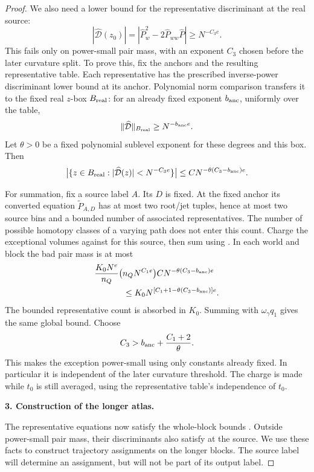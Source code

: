 \begin{proof}
We also need a lower bound for the representative
discriminant at the real source:
\begin{equation}
 |\widehat{\mathcal D}(z_0)|
 =
 |\widehat P_w^2-2\widehat P_{ww}\widehat P|
 \ge N^{-C_3e}.
 \label{a02:representative-disc-lower}
\end{equation}
This fails only on power-small pair mass, with an exponent
\(C_3\) chosen before the later curvature split.  To prove this,
fix the anchors and the resulting representative table.  Each
representative has the prescribed inverse-power discriminant
lower bound at its anchor.  Polynomial norm comparison transfers
it to the fixed real \(z\)-box \(B_{\rm real}\): for an already
fixed exponent \(b_{\rm anc}\), uniformly over the table,
\[
 \|\widehat{\mathcal D}\|_{B_{\rm real}}
 \ge N^{-b_{\rm anc}e}.
\]
Let \(\theta>0\) be a fixed polynomial sublevel exponent for
these degrees and this box.  Then
\[
 \bigl|\{z\in B_{\rm real}:
       |\widehat{\mathcal D}(z)|<N^{-C_3e}\}\bigr|
 \le C N^{-\theta(C_3-b_{\rm anc})e}.
\]

For summation, fix a source label \(A\).  Its \(D\)
is fixed.  At the fixed anchor its converted equation
\(\widetilde P_{A,D}\) has at most two root/jet tuples,
hence at most two source
bins and a bounded number of associated representatives.
The number of possible homotopy classes of a varying
path does not enter this count.  Charge the exceptional
volumes against  for
this source, then sum using .
In each world and block the bad pair mass is at most
\begin{align*}
 &\frac{K_0N^e}{n_Q}
   \bigl(n_QN^{C_1e}\bigr)
   C N^{-\theta(C_3-b_{\rm anc})e}\\
 &\hspace{12mm}\le
 K_0N^{[C_1+1-\theta(C_3-b_{\rm anc})]e}.
\end{align*}
The bounded representative count is absorbed in \(K_0\).
Summing with \(\omega_\gamma q_1\) gives the same global bound.
Choose
\[
 C_3>b_{\rm anc}+\frac{C_1+2}{\theta}.
\]
This makes the exception power-small using only constants
already fixed.  In particular it is independent of the later
curvature threshold.  The charge is made while \(t_0\) is still
averaged, using the representative table's independence of \(t_0\).

\par\medskip\noindent\textbf{3. Construction of the longer atlas.}

The representative equations now satisfy the whole-block bounds
.  Outside power-small pair mass,
their discriminants also satisfy
 at the source.  We use these
facts to construct trajectory assignments on the longer blocks.
The source label will determine an assignment, but will not be
part of its output label.


\end{proof}
